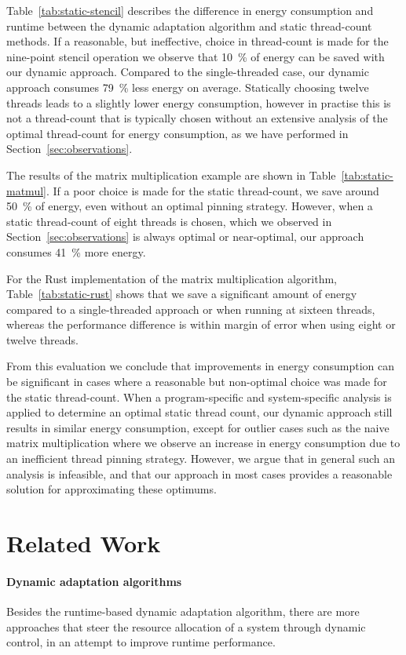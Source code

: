 \documentclass[runningheads]{llncs}
\begin{document}
Table~\ref{tab:static-stencil} describes the difference in energy consumption and runtime between the dynamic adaptation algorithm and static thread-count methods.
If a reasonable, but ineffective, choice in thread-count is made for the nine-point stencil operation we observe that \qty{10}{\percent} of energy can be saved with our dynamic approach.
Compared to the single-threaded case, our dynamic approach consumes \qty{79}{\percent} less energy on average.
Statically choosing twelve threads leads to a slightly lower energy consumption, however in practise this is not a thread-count that is typically chosen without an extensive analysis of the optimal thread-count for energy consumption, as we have performed in Section~\ref{sec:observations}.

The results of the matrix multiplication example are shown in Table~\ref{tab:static-matmul}.
If a poor choice is made for the static thread-count, we save around \qty{50}{\percent} of energy, even without an optimal pinning strategy.
However, when a static thread-count of eight threads is chosen, which we observed in Section~\ref{sec:observations} is always optimal or near-optimal, our approach consumes \qty{41}{\percent} more energy.

For the Rust implementation of the matrix multiplication algorithm, Table~\ref{tab:static-rust} shows that we save a significant amount of energy compared to a single-threaded approach or when running at sixteen threads, whereas the performance difference is within margin of error when using eight or twelve threads.

From this evaluation we conclude that improvements in energy consumption can be significant in cases where a reasonable but non-optimal choice was made for the static thread-count.
When a program-specific and system-specific analysis is applied to determine an optimal static thread count, our dynamic approach still results in similar energy consumption, except for outlier cases such as the naive matrix multiplication where we observe an increase in energy consumption due to an inefficient thread pinning strategy.
However, we argue that in general such an analysis is infeasible, and that our approach in most cases provides a reasonable solution for approximating these optimums.

\section{Related Work}
\paragraph{Dynamic adaptation algorithms}
Besides the runtime-based dynamic adaptation algorithm\cite{gordon2015dynamic}, there are more approaches that steer the resource allocation of a system through dynamic control, in an attempt to improve runtime performance.
\end{document}
